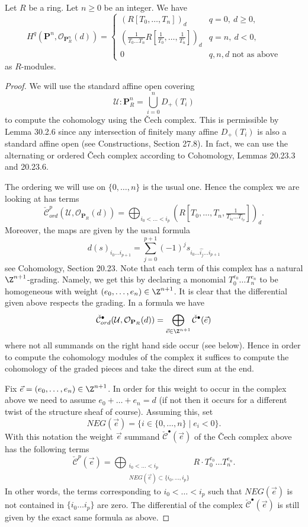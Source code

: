 \begin{lemma}[30.8.1]
Let $R$ be a ring. Let $n\geq0$ be an integer. We have
\[
H^q(\mathbf P^n,\mathcal O_{\mathbf P_R^n}(d))=
\begin{cases}
(R[T_0,\ldots,T_n])_d& q=0,\ d\geq0,\\
\left(\frac1{T_0\ldots T_n}R[\frac1{T_0},\ldots,\frac1{T_n}]\right)_d& q=n,\ d<0,\\
0& q,n,d\text{ not as above}
\end{cases}
\]
as $R$-modules.
\end{lemma}
\begin{proof}
We will use the standard affine open covering
\[
\mathcal U:\mathbf P_R^n=\bigcup_{i=0}^nD_+(T_i)
\]
to compute the cohomology using the \v Cech complex. This is permissible by Lemma 30.2.6 since any intersection of finitely many affine $D_+(T_i)$ is also a standard affine open (see Constructions, Section 27.8). In fact, we can use the alternating or ordered \v Cech complex according to Cohomology, Lemmas 20.23.3 and 20.23.6.

The ordering we will use on $\{0,\ldots,n\}$ is the usual one. Hence the complex we are looking at has terms
\[
\check{\mathcal C}_{ord}^p(\mathcal U,\mathcal O_{\mathbf P_R}(d))
=\bigoplus_{i_0<\ldots<i_p}(R[T_0,\ldots,T_n,\tfrac1{T_{i_0}\ldots T_{i_p}}])_d.
\]
Moreover, the maps are given by the usual formula
\[
d(s)_{i_0\ldots i_{p+1}}=\sum_{j=0}^{p+1}(-1)^js_{i_0\ldots\widehat{i_j}\ldots i_{p+1}}
\]
see Cohomology, Section 20.23. Note that each term of this complex has a natural $\Z^{n+1}$-grading. Namely, we get this by declaring a monomial $T_0^{e_0}\ldots T_n^{e_n}$ to be homogeneous with weight $(e_0,\ldots,e_n)\in\Z^{n+1}$. It is clear that the differential given above respects the grading. In a formula we have
\[
\check{\mathcal C}_{ord}^{\bullet}(\mathcal U,\mathcal O_{\mathbf P_R}(d))
=\bigoplus_{\vec e\in\Z^{n+1}}\check{\mathcal C}^{\bullet}(\vec e)
\]
where not all summands on the right hand side occur (see below). Hence in order to compute the cohomology modules of the complex it suffices to compute the cohomology of the graded pieces and take the direct sum at the end.

Fix $\vec e=(e_0,\ldots,e_n)\in\Z^{n+1}$. In order for this weight to occur in the complex above we need to assume $e_0+\ldots+e_n=d$ (if not then it occurs for a different twist of the structure sheaf of course). Assuming this, set
\[
NEG(\vec e)=\{i\in\{0,\ldots,n\}\mid e_i<0\}.
\]
With this notation the weight $\vec e$ summand $\check{\mathcal C}^{\bullet}(\vec e)$ of the \v Cech complex above has the following terms
\[
\check{\mathcal C}^{p}(\vec e)
=\bigoplus_{\substack{i_0<\ldots<i_p\\NEG(\vec e)\subset\{i_0,\ldots,i_p\}}}
R\cdot T_0^{e_0}\ldots T_n^{e_n}.
\]
In other words, the terms corresponding to $i_0<\ldots<i_p$ such that $NEG(\vec e)$ is not contained in $\{i_0\ldots i_p\}$ are zero. The differential of the complex $\check{\mathcal C}^{\bullet}(\vec e)$ is still given by the exact same formula as above.


\end{proof}
